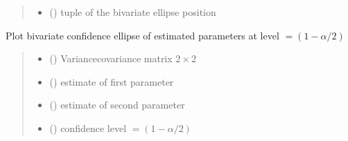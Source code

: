 \documentclass[letterpaper,10pt,english]{sphinxmanual}
\begin{document}
\begin{fulllineitems}
\begin{quote}
\begin{description}
\begin{itemize}
\item {} 
\sphinxAtStartPar
{} () \textendash{} tuple of the bivariate ellipse position

\end{itemize}

\end{description}\end{quote}

\end{fulllineitems}


\begin{fulllineitems}
\label{\detokenize{cubmods:cubmods.general.conf_ell}}
\pysigstartsignatures
{}
\pysigstopsignatures
\sphinxAtStartPar
Plot bivariate confidence ellipse of estimated
parameters at level \(=(1 - \alpha/2)\)
\begin{quote}\begin{description}
\begin{itemize}
\item {} 
\sphinxAtStartPar
{} () \textendash{} Variance\sphinxhyphen{}covariance matrix \(2 \times 2\)

\item {} 
\sphinxAtStartPar
{} () \textendash{} estimate of first parameter

\item {} 
\sphinxAtStartPar
{} () \textendash{} estimate of second parameter

\item {} 
\sphinxAtStartPar
{} () \textendash{} confidence level \(=(1 - \alpha/2)\)


\end{itemize}
\end{description}
\end{quote}
\end{fulllineitems}
\end{document}
